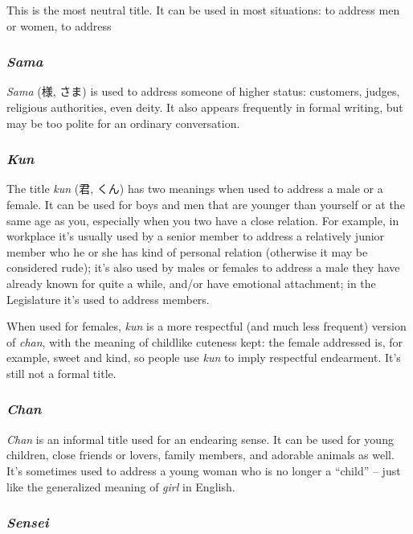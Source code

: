 \documentclass[UTF8, a4paper, oneside, scheme=plain]{ctexrep}
\newcommand{\corpus}[1]{\emph{#1}}
\begin{document}
This is the most neutral title.
It can be used in most situations:
to address men or women, to address 

\subsubsection{\corpus{Sama}}

\corpus{Sama} (様, さま) is used to address someone of higher status:
customers, judges, religious authorities, even deity.
It also appears frequently in formal writing, 
but may be too polite for an ordinary conversation.

\subsubsection{\corpus{Kun}}

The title \corpus{kun} (君, くん) has two meanings when used to address a male or a female.
It can be used for boys and men that are younger than yourself or at the same age as you,
especially when you two have a close relation.
For example, 
in workplace it's usually used by a senior member to address a relatively junior member 
who he or she has kind of personal relation (otherwise it may be considered rude);
it's also used by males or females to address a male they have already known for quite a while,
and/or have emotional attachment;
in the Legislature it's used to address members.

When used for females, \corpus{kun} is a more respectful (and much less frequent) version of \corpus{chan},
with the meaning of childlike cuteness kept:
the female addressed is, for example, sweet and kind,
so people use \corpus{kun} to imply respectful endearment.
It's still not a formal title.

\subsubsection{\corpus{Chan}}

\corpus{Chan} is an informal title used for an endearing sense.
It can be used for young children, close friends or lovers, family members, and adorable animals as well.
It's sometimes used to address a young woman who is no longer a ``child'' 
-- just like the generalized meaning of \corpus{girl} in English.

\subsubsection{\corpus{Sensei}}
\end{document}
